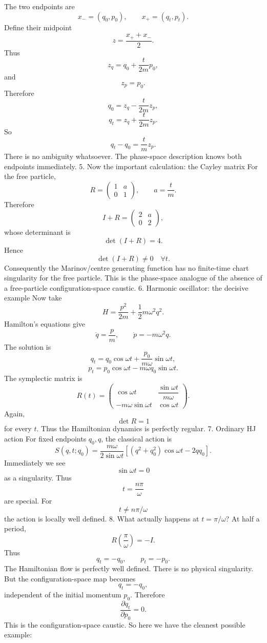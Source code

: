 The two endpoints are
$$ x_-=(q_0,p_0), \qquad x_+=(q_t,p_t). $$
Define their midpoint
$$ z=\frac{x_++x_-}{2}. $$
Thus
$$ z_q = q_0+\frac{t}{2m}p_0, $$
and
$$ z_p=p_0. $$
Therefore
$$ q_0=z_q-\frac{t}{2m}z_p, $$ $$ q_t=z_q+\frac{t}{2m}z_p. $$
So
$$ q_t-q_0=\frac{t}{m}z_p. $$
There is no ambiguity whatsoever.
The phase-space description knows both endpoints immediately.
5. Now the important calculation: the Cayley matrix
For the free particle,
$$ R= \begin{pmatrix} 1&a\\ 0&1 \end{pmatrix}, \qquad a=\frac{t}{m}. $$
Therefore
$$ I+R= \begin{pmatrix} 2&a\\ 0&2 \end{pmatrix}, $$
whose determinant is
$$ \det(I+R)=4. $$
Hence
$$ \boxed{\det(I+R)\neq0\quad\forall t.} $$
Consequently the Marinov/centre generating function has no finite-time chart singularity for the free particle.
This is the phase-space analogue of the absence of a free-particle configuration-space caustic.
6. Harmonic oscillator: the decisive example
Now take
$$ H=\frac{p^2}{2m}+\frac12m\omega^2q^2. $$
Hamilton's equations give
$$ \dot q=\frac{p}{m}, \qquad \dot p=-m\omega^2q. $$
The solution is
$$ q_t = q_0\cos\omega t + \frac{p_0}{m\omega}\sin\omega t, $$ $$ p_t = p_0\cos\omega t - m\omega q_0\sin\omega t. $$
The symplectic matrix is
$$ R(t)= \begin{pmatrix} \cos\omega t& \dfrac{\sin\omega t}{m\omega} \\[2mm] -m\omega\sin\omega t& \cos\omega t \end{pmatrix}. $$
Again,
$$ \det R=1 $$
for every \(t\).
Thus the Hamiltonian dynamics is perfectly regular.
7. Ordinary HJ action
For fixed endpoints \(q_0,q\), the classical action is
$$ S(q,t;q_0) = \frac{m\omega} {2\sin\omega t} \left[ (q^2+q_0^2)\cos\omega t -2qq_0 \right]. $$
Immediately we see
$$ \boxed{\sin\omega t=0} $$
as a singularity.
Thus
$$ t=\frac{n\pi}{\omega} $$
are special.
For
$$ t\neq n\pi/\omega $$
the action is locally well defined.
8. What actually happens at \(t=\pi/\omega\)?
At half a period,
$$ R\left(\frac{\pi}{\omega}\right) = -I. $$
Thus
$$ q_t=-q_0, \qquad p_t=-p_0. $$
The Hamiltonian flow is perfectly well defined.
There is no physical singularity.
But the configuration-space map becomes
$$ q_t=-q_0, $$
independent of the initial momentum \(p_0\).
Therefore
$$ \frac{\partial q_t}{\partial p_0}=0. $$
This is the configuration-space caustic.
So here we have the cleanest possible example:
